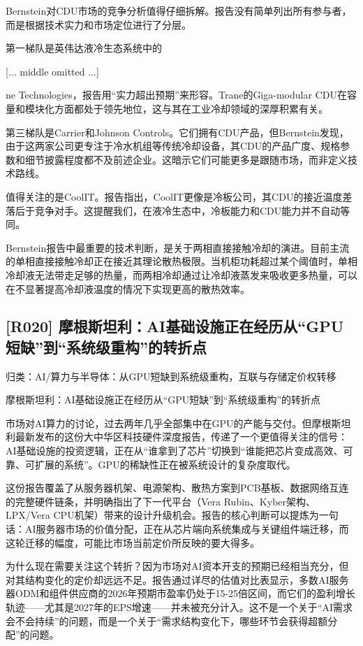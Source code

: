 \documentclass[11pt]{ctexart}
\begin{document}
Bernstein对CDU市场的竞争分析值得仔细拆解。报告没有简单列出所有参与者，而是根据技术实力和市场定位进行了分层。

第一梯队是英伟达液冷生态系统中的

[... middle omitted ...]

ne Technologies，报告用“实力超出预期”来形容。Trane的Giga-modular CDU在容量和模块化方面都处于领先地位，这与其在工业冷却领域的深厚积累有关。

第三梯队是Carrier和Johnson Controls。它们拥有CDU产品，但Bernstein发现，由于这两家公司更专注于冷水机组等传统冷却设备，其CDU的产品广度、规格参数和细节披露程度都不及前述企业。这暗示它们可能更多是跟随市场，而非定义技术路线。

值得关注的是CoolIT。报告指出，CoolIT更像是冷板公司，其CDU的接近温度差落后于竞争对手。这提醒我们，在液冷生态中，冷板能力和CDU能力并不自动等同。

Bernstein报告中最重要的技术判断，是关于两相直接接触冷却的演进。目前主流的单相直接接触冷却正在接近其理论散热极限。当机柜功耗超过某个阈值时，单相冷却液无法带走足够的热量，而两相冷却通过让冷却液蒸发来吸收更多热量，可以在不显著提高冷却液温度的情况下实现更高的散热效率。

\subsection{[R020] 摩根斯坦利：AI基础设施正在经历从“GPU短缺”到“系统级重构”的转折点}
{\small\color{refgray}归类：AI/算力与半导体：从GPU短缺到系统级重构，互联与存储定价权转移}

摩根斯坦利：AI基础设施正在经历从“GPU短缺”到“系统级重构”的转折点

市场对AI算力的讨论，过去两年几乎全部集中在GPU的产能与交付。但摩根斯坦利最新发布的这份大中华区科技硬件深度报告，传递了一个更值得关注的信号：AI基础设施的投资逻辑，正在从“谁拿到了芯片”切换到“谁能把芯片变成高效、可靠、可扩展的系统”。GPU的稀缺性正在被系统设计的复杂度取代。

这份报告覆盖了从服务器机架、电源架构、散热方案到PCB基板、数据网络互连的完整硬件链条，并明确指出了下一代平台（Vera Rubin、Kyber架构、LPX/Vera CPU机架）带来的设计升级机会。报告的核心判断可以提炼为一句话：AI服务器市场的价值分配，正在从芯片端向系统集成与关键组件端迁移，而这轮迁移的幅度，可能比市场当前定价所反映的要大得多。

为什么现在需要关注这个转折？因为市场对AI资本开支的预期已经相当充分，但对其结构变化的定价却远远不足。报告通过详尽的估值对比表显示，多数AI服务器ODM和组件供应商的2026年预期市盈率仍处于15-25倍区间，而它们的盈利增长轨迹——尤其是2027年的EPS增速——并未被充分计入。这不是一个关于“AI需求会不会持续”的问题，而是一个关于“需求结构变化下，哪些环节会获得超额分配”的问题。
\end{document}
